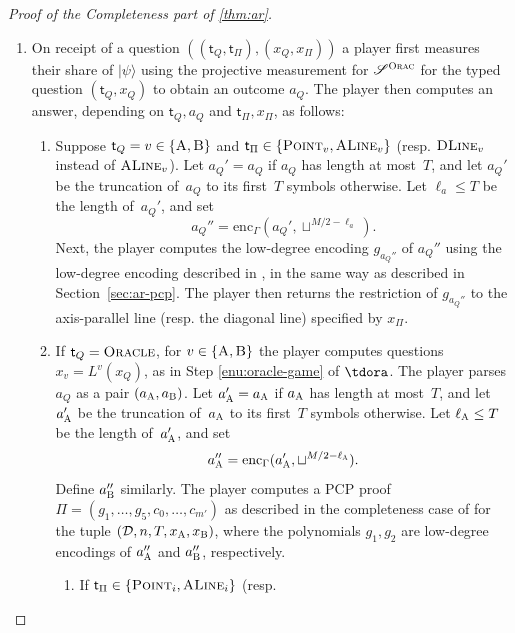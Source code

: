 \documentclass[11pt]{article}
\theoremstyle{definition}
\newcommand{\ket}[1]{|#1\rangle}
\newcommand{\decider}{\mathcal{D}}
\newcommand{\strategy}{\mathscr{S}}
\newcommand{\gamestyle}[1]{\ensuremath{\textsc{#1}}\xspace}
\newcommand{\ora}{\gamestyle{Orac}}
\newcommand{\labelstyle}[1]{\ensuremath{\textsc{#1}}\xspace}
\newcommand{\tvarstyle}[1]{\mathsf{#1}}
\newcommand{\tvar}{\ensuremath{\tvarstyle{t}}}
\newcommand{\alice}{\labelstyle{A}}
\newcommand{\bob}{\labelstyle{B}}
\newcommand{\oracle}{\labelstyle{Oracle}}
\newcommand{\typestyle}[1]{\ensuremath{\textsc{#1}}\xspace}
\newcommand{\Point}{\typestyle{Point}}
\newcommand{\ALine}{\typestyle{ALine}}
\newcommand{\DLine}{\typestyle{DLine}}
\begin{document}
\begin{proof}[Proof of the Completeness part of \cref{thm:ar}]
  \begin{enumerate}
  \item On receipt of a question $((\tvar_Q,\tvar_\Pi),(x_Q, x_\Pi))$ a player
    first measures their share of $\ket{\psi}$ using the projective measurement
    for $\strategy^\ora$ for the typed question $(\tvar_Q,x_Q)$ to obtain an
    outcome $a_Q$.
    The player then computes an answer, depending on $\tvar_Q, a_Q$ and
    $\tvar_\Pi,x_\Pi$, as follows:
    \begin{enumerate}
    \item Suppose $\tvar_Q = v \in \{\alice,\bob\}$ and $\tvar_\Pi \in
      \{\Point_v, \ALine_v \}$ (resp. $\DLine_v$ instead of $\ALine_v$).
      Let $a_Q' = a_Q$ if $a_Q$ has length at most~$T$, and let $a_Q'$ be the
      truncation of~$a_Q$ to its first~$T$ symbols otherwise.
      Let $\ell_a \leq T$ be the length of~$a_Q'$, and set 
      \begin{equation*}
      a_Q'' = \mathrm{enc}_\Gamma(a_Q', \sqcup^{M/2 - \ell_a}).
      \end{equation*}
      Next, the player computes the low-degree encoding $g_{a_Q''}$ of $a_Q''$
      using the low-degree encoding described in , in the
      same way as described in Section~\ref{sec:ar-pcp}.
      The player then returns the restriction of $g_{a_Q''}$ to the
      axis-parallel line (resp.
      the diagonal line) specified by $x_\Pi$.
\item
If $\tvar_Q=\oracle$, for $v \in \{\alice, \bob\}$ the player computes
      questions $x_v = L^{v}(x_Q)$, as in Step \ref{enu:oracle-game} of
      $\tdora$.
      The player parses $a_Q$ as a pair $(a_\alice, a_\bob)$.
      Let $a_\alice' = a_\alice$ if $a_\alice$ has length at most~$T$, and let
      $a_\alice'$ be the truncation of~$a_\alice$ to its first~$T$ symbols
      otherwise.
      Let $\ell_{\alice} \leq T$ be the length of~$a_\alice'$, and set
      \begin{equation*}
        a_\alice'' = \mathrm{enc}_\Gamma(a_\alice', \sqcup^{M/2 - \ell_{\alice}}).
      \end{equation*}
      Define $a_\bob''$ similarly.
      The player computes a PCP proof $\Pi=(g_1, \dots, g_5, c_0, \dots, c_{m'})$ as
      described in the completeness case of  for the tuple
      $(\decider, n, T, x_\alice, x_\bob)$, where the polynomials $g_1, g_2$ are
      low-degree encodings of $a_\alice''$ and $a_\bob''$, respectively.
      \begin{enumerate}
      \item If $\tvar_\Pi \in \{\Point_i, \ALine_i\}$ (resp.

\end{enumerate}
\end{enumerate}
\end{enumerate}
\end{proof}
\end{document}
